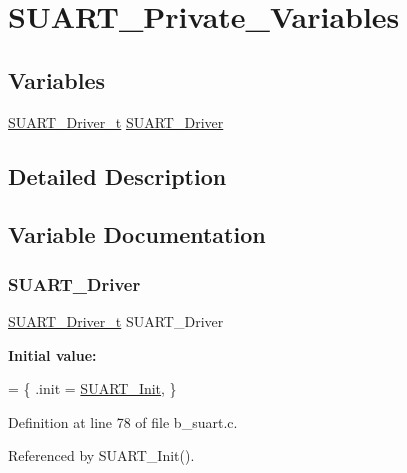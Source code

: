 \hypertarget{group___s_u_a_r_t___private___variables}{}\section{S\+U\+A\+R\+T\+\_\+\+Private\+\_\+\+Variables}
\label{group___s_u_a_r_t___private___variables}
\subsection*{Variables}
\begin{DoxyCompactItemize}
\item 
\mbox{\hyperlink{group___s_u_a_r_t___exported___types_definitions_ga76678b78633641a143ec958271e0bc05}{S\+U\+A\+R\+T\+\_\+\+Driver\+\_\+t}} \mbox{\hyperlink{group___s_u_a_r_t___private___variables_ga2653dcd74de96e06405a5207f6f53f3e}{S\+U\+A\+R\+T\+\_\+\+Driver}}
\end{DoxyCompactItemize}


\subsection{Detailed Description}


\subsection{Variable Documentation}
\mbox{\label{group___s_u_a_r_t___private___variables_ga2653dcd74de96e06405a5207f6f53f3e}} 
\subsubsection{\texorpdfstring{S\+U\+A\+R\+T\+\_\+\+Driver}{SUART\_Driver}}
{\footnotesize\ttfamily \mbox{\hyperlink{group___s_u_a_r_t___exported___types_definitions_ga76678b78633641a143ec958271e0bc05}{S\+U\+A\+R\+T\+\_\+\+Driver\+\_\+t}} S\+U\+A\+R\+T\+\_\+\+Driver}

{\bfseries Initial value\+:}
\begin{DoxyCode}
= 
\{
    .init = \mbox{\hyperlink{group___s_u_a_r_t___exported___functions_ga4905cf58b8ed4c083969f3f9131e38ff}{SUART\_Init}},
\}
\end{DoxyCode}


Definition at line 78 of file b\+\_\+suart.\+c.



Referenced by S\+U\+A\+R\+T\+\_\+\+Init().


